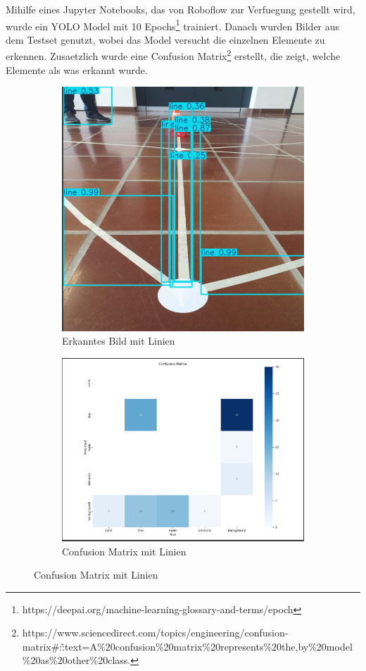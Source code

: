 Mihilfe eines Jupyter Notebooks, das von Roboflow zur Verfuegung gestellt wird, wurde ein YOLO Model mit 10 Epochs\footnote{https://deepai.org/machine-learning-glossary-and-terms/epoch} trainiert. Danach wurden Bilder aus dem Testset genutzt, wobei das Model versucht die einzelnen Elemente zu erkennen. Zusaetzlich wurde eine Confusion Matrix\footnote{https://www.sciencedirect.com/topics/engineering/confusion-matrix\#:\~:text=A\%20confusion\%20matrix\%20represents\%20the,by\%20model\%20as\%20other\%20class.} erstellt, die zeigt, welche Elemente als was erkannt wurde.

\begin{figure}[H]
\begin{subfigure}{0.3\textwidth}
\includegraphics[width=0.95\linewidth]{assets/informatik-prototyp/yolo/line-recognitions.png} 
\caption{Erkanntes Bild mit Linien}
\label{fig:image-recognition-with-lines}
\end{subfigure}
\begin{subfigure}{0.69\textwidth}
\includegraphics[width=0.95\linewidth]{assets/informatik-prototyp/yolo/conf-matrix-lines.png} 
\caption{Confusion Matrix mit Linien}
\label{fig:conf-matrix-lines}
\end{subfigure}


\end{figure}
